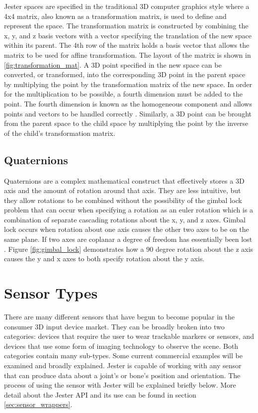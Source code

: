 Jester spaces are specified in the traditional 3D computer graphics style where a 4x4 matrix, also known as a transformation matrix, is used to define and represent the space. The transformation matrix is constructed by combining the x, y, and z basis vectors with a vector specifying the translation of the new space within its parent. The 4th row of the matrix holds a basis vector that allows the matrix to be used for affine transformation. The layout of the matrix is shown in \ref{fig:transformation_mat}. A 3D point specified in the new space can be converted, or transformed, into the corresponding 3D point in the parent space by multiplying the point by the transformation matrix of the new space. In order for the multiplication to be possible, a fourth dimension must be added to the point. The fourth dimension is known as the homogeneous component and allows points and vectors to be handled correctly \cite{roberts1963machine}. Similarly, a 3D point can be brought from the parent space to the child space by multiplying the point by the inverse of the child’s transformation matrix.

\subsection{Quaternions}

Quaternions are a complex mathematical construct that effectively stores a 3D axis and the amount of rotation around that axis. They are less intuitive, but they allow rotations to be combined without the possibility of the gimbal lock problem that can occur when specifying a rotation as an euler rotation which is a combination of separate cascading rotations about the x, y, and z axes. Gimbal lock occurs when rotation about one axis causes the other two axes to be on the same plane. If two axes are coplanar a degree of freedom has essentially been lost \cite{gortler2012foundations}. Figure \ref{fig:gimbal_lock} demonstrates how a 90 degree rotation about the z axis causes the y and x axes to both specify rotation about the y axis.

\section{Sensor Types}

There are many different sensors that have begun to become popular in the consumer 3D input device market. They can be broadly broken into two categories: devices that require the user to wear trackable markers or sensors, and devices that use some form of imaging technology to observe the scene. Both categories contain many sub-types. Some current commercial examples will be examined and broadly explained. Jester is capable of working with any sensor that can produce data about a joint’s or bone’s position and orientation. The process of using the sensor with Jester will be explained briefly below. More detail about the Jester API and its use can be found in section \ref{sec:sensor_wrappers}. 

